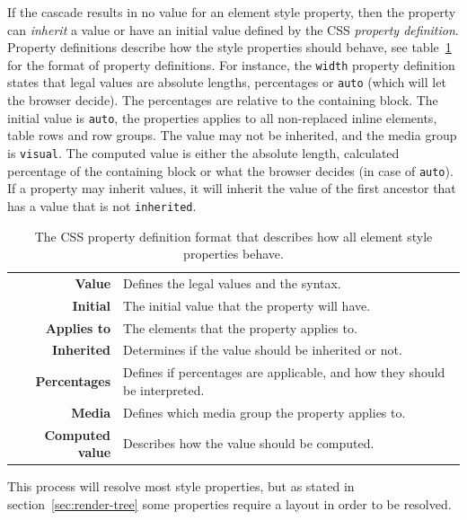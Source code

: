 \documentclass[a4paper,11pt]{kth-mag}
\newcommand{\code}[1]{\texttt{#1}}
\begin{document}
        If the cascade results in no value for an \gls{element} style property, then the property can \emph{inherit} a value or have an initial value defined by the \gls{CSS} \emph{property definition}.
        Property definitions describe how the style properties should behave, see table~\ref{table:css_property_definition} for the format of property definitions.
        For instance, the \code{width} property definition states that legal values are absolute lengths, percentages or \code{auto} (which will let the \gls{browser} decide).
        The percentages are relative to the containing block.
        The initial value is \code{auto}, the properties applies to all non-replaced inline \glspl{element}, table rows and row groups.
        The value may not be inherited, and the media group is \code{visual}.
        The computed value is either the absolute length, calculated percentage of the containing block or what the \gls{browser} decides (in case of \code{auto}).
        If a property may inherit values, it will inherit the value of the first ancestor that has a value that is not \code{inherited}.

        \begin{table}[ht]\center
          \tiny
          \begin{tabular}[t]{ r | l }
            \textbf{Value} & Defines the legal values and the syntax. \\
            \textbf{Initial} & The initial value that the property will have. \\
            \textbf{Applies to} & The \glspl{element} that the property applies to. \\
            \textbf{Inherited} & Determines if the value should be inherited or not. \\
            \textbf{Percentages} & Defines if percentages are applicable, and how they should be interpreted. \\
            \textbf{Media} & Defines which media group the property applies to. \\
            \textbf{Computed value} & Describes how the value should be computed. \\
          \end{tabular}
          \caption{The \gls{CSS} property definition format that describes how all \gls{element} style properties behave.}
          \label{table:css_property_definition}
        \end{table}

        This process will resolve most style properties, but as stated in section~\ref{sec:render-tree} some properties require a layout in order to be resolved.
\end{document}
